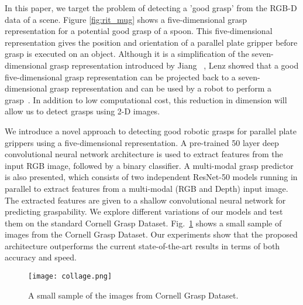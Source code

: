 \documentclass[10pt,twocolumn,letterpaper]{article}
\begin{document}
In this paper, we target the problem of detecting a 'good grasp' from the RGB-D data of a scene. Figure \ref{fig:rit_mug} shows a five-dimensional grasp representation for a potential good grasp of a spoon. This five-dimensional representation gives the position and orientation of a parallel plate gripper before grasp is executed on an object. Although it is a simplification of the seven-dimensional grasp representation introduced by Jiang \etal ~\cite{jiang2011efficient}, Lenz \etal showed that a good five-dimensional grasp representation can be projected back to a seven-dimensional grasp representation and can be used by a robot to perform a grasp~\cite{lenz2015deep}. In addition to low computational cost, this reduction in dimension will allow us to detect grasps using 2-D images.

We introduce a novel approach to detecting good robotic grasps for parallel plate grippers using a five-dimensional representation. A pre-trained 50 layer deep convolutional neural network architecture is used to extract features from the input RGB image, followed by a binary classifier. A multi-modal grasp predictor is also presented, which consists of two independent ResNet-50 models running in parallel to extract features from a multi-modal (RGB and Depth) input image. The extracted features are given to a shallow convolutional neural network for predicting graspability. We explore different variations of our models and test them on the standard Cornell Grasp Dataset. Fig.~\ref{fig:dataset} shows a small sample of images from the Cornell Grasp Dataset. Our experiments show that the proposed architecture outperforms the current state-of-the-art results in terms of both accuracy and speed. 

\begin{figure}
\begin{center}
\texttt{[image: collage.png]}
\end{center}
   \caption{A small sample of the images from Cornell Grasp Dataset.}
\label{fig:dataset}
\end{figure}
\end{document}

